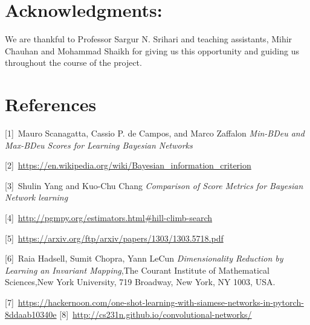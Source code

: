 \documentclass{article}
\begin{document}
\section*{Acknowledgments:}
We are thankful to Professor Sargur N. Srihari and teaching assistants, Mihir Chauhan and Mohammad Shaikh for giving us this opportunity and guiding us throughout the course of the project.

\section*{References}

[1]\ Mauro Scanagatta, Cassio P. de Campos, and Marco Zaffalon \textit{Min-BDeu and Max-BDeu Scores for Learning
Bayesian Networks}

[2]\  \url{https://en.wikipedia.org/wiki/Bayesian_information_criterion}

[3]\  Shulin Yang and Kuo-Chu Chang \textit{Comparison of Score Metrics for Bayesian Network learning }

[4]\  \url{http://pgmpy.org/estimators.html#hill-climb-search}

[5]\  \url{https://arxiv.org/ftp/arxiv/papers/1303/1303.5718.pdf}

[6]\ Raia Hadsell, Sumit Chopra, Yann LeCun \textit{Dimensionality Reduction by Learning an Invariant Mapping},The Courant Institute of Mathematical Sciences,New York University, 719 Broadway, New York, NY 1003, USA. 

[7]\ \url{https://hackernoon.com/one-shot-learning-with-siamese-networks-in-pytorch-8ddaab10340e}
[8]\ \url{http://cs231n.github.io/convolutional-networks/}
\end{document}
